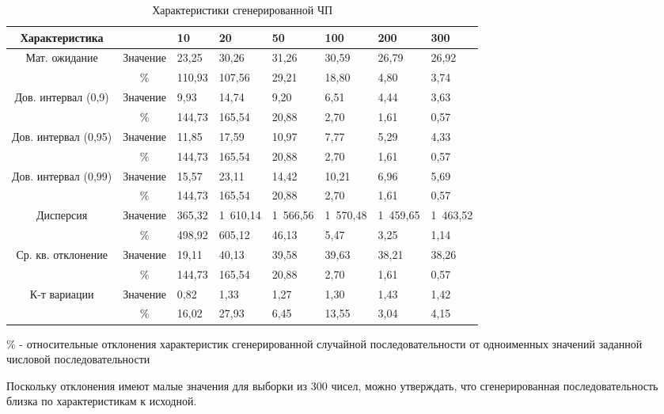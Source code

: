\documentclass[14pt]{article}
\begin{document}
\begin{table}[h]
	\centering
	\caption{Характеристики сгенерированной ЧП}
	\begin{tabularx}{\textwidth}{| c | c | X | X | X | X | X | X |}
		\hline
		Характеристика & & 10 & 20 & 50 & 100 & 200 & 300 \\
		\hline
		\multirow{2}{*}{Мат. ожидание} & Значение & 23,25&	30,26	&31,26	&30,59	&26,79	&26,92\\
		\cline{2-8}
		 & \% & 110,93	&107,56&	29,21	&18,80&	4,80	&3,74 \\
		\hline
		\multirow{2}{*}{Дов. интервал (0,9)} & Значение & 9,93	&14,74&	9,20	&6,51	&4,44	&3,63 \\
		\cline{2-8}
		 & \% & 144,73	&165,54	&20,88	&2,70	&1,61	&0,57\\
		\hline
		\multirow{2}{*}{Дов. интервал (0,95)} & Значение  & 11,85	&17,59	&10,97	&7,77	&5,29	&4,33  \\
		\cline{2-8}
		 & \% &  144,73&	165,54	&20,88&	2,70&	1,61&	0,57\\
		\hline
		\multirow{2}{*}{Дов. интервал (0,99)} & Значение & 15,57&	23,11&	14,42&	10,21	&6,96	&5,69 \\
		\cline{2-8} 
		& \% & 144,73	&165,54&	20,88	&2,70	&1,61	&0,57\\
		\hline
		\multirow{2}{*}{Дисперсия} & Значение & 365,32&	1 610,14	&1 566,56	&1 570,48&	1 459,65	&1 463,52 \\
		\cline{2-8}
		 & \% & 498,92&	605,12&	46,13&	5,47&	3,25	&1,14 \\
		\hline
		\multirow{2}{*}{Ср. кв. отклонение} & Значение &  19,11&40,13	&39,58&	39,63	&38,21&	38,26 \\
		\cline{2-8}
		 & \% & 144,73	&165,54	&20,88	&2,70	&1,61&	0,57 \\
		\hline
		\multirow{2}{*}{К-т вариации} & Значение &  0,82&	1,33&	1,27&	1,30	&1,43&	1,42 \\
		\cline{2-8}
		 & \% &  16,02	&27,93&	6,45&	13,55	&3,04	&4,15\\
		\hline
	\end{tabularx}
\end{table}
	
	\% - относительные отклонения характеристик сгенерированной случайной последовательности от одноименных значений заданной числовой последовательности

	Поскольку отклонения имеют малые значения для выборки из 300 чисел, можно утверждать, что сгенерированная последовательность близка по характеристикам к исходной.
\end{document}
